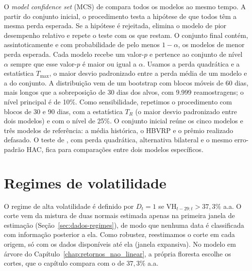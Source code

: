 O \textit{model confidence set} (MCS) de \citet{hansen2011model} compara todos
os modelos ao mesmo tempo. A partir do conjunto inicial, o procedimento testa a
hipótese de que todos têm a mesma perda esperada. Se a hipótese é rejeitada,
elimina o modelo de pior desempenho relativo e repete o teste com os que
restam. O conjunto final contém, assintoticamente e com probabilidade de pelo
menos $1-\alpha$, os modelos de menor perda esperada. Cada modelo recebe um
valor-$p$ e pertence ao conjunto de nível $\alpha$ sempre que esse valor-$p$ é
maior ou igual a $\alpha$. Usamos a perda quadrática e a estatística
$T_{\max}$, o maior desvio padronizado entre a perda média de um modelo e a do
conjunto. A distribuição vem de um bootstrap com blocos móveis de 60 dias, mais
longos que a sobreposição de 30 dias dos alvos, com 9.999 reamostragens; o
nível principal é de 10\%. Como sensibilidade, repetimos o
procedimento com blocos de 30 e 90 dias, com a estatística $T_R$ (o maior
desvio padronizado entre dois modelos) e com o nível de 25\%. O conjunto inicial reúne os cinco modelos e três
modelos de referência: a média histórica, o HBVRP e o prêmio realizado
defasado. O teste de \citet{diebold1995comparing}, com perda quadrática,
alternativa bilateral e o mesmo erro-padrão HAC, fica para comparações entre
dois modelos específicos.

\section{Regimes de volatilidade}
\label{sec:met-regimes}

O regime de alta volatilidade é definido por $D_t = 1$ se
$\text{VH}_{t-29:t} > 37{,}3\%$ a.a. O corte vem da mistura de duas normais
estimada apenas na primeira janela de estimação (Seção~\ref{sec:dados-regimes}), de
modo que nenhuma data é classificada com informação posterior a ela. Como
robustez, reestimamos o corte em cada origem, só com os dados
disponíveis até ela (janela expansiva). No modelo em árvore do
Capítulo~\ref{chap:retornos_nao_linear}, a própria floresta escolhe os cortes, que o capítulo
compara com o de $37{,}3\%$ a.a.
